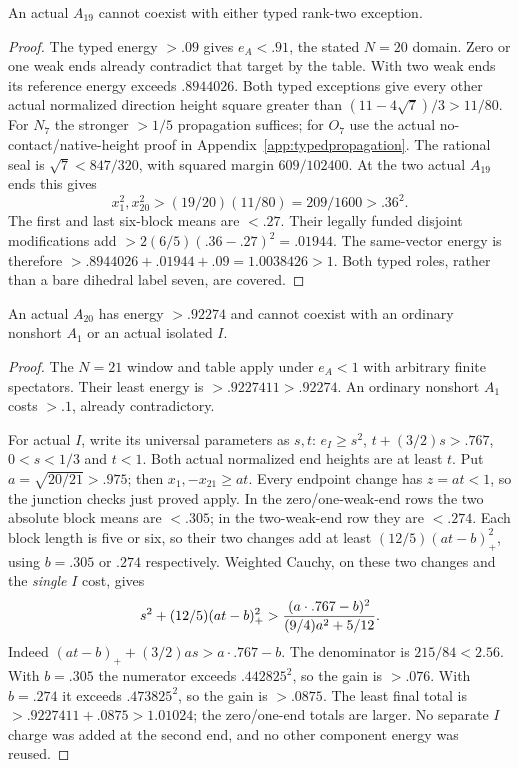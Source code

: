 \begin{lemma}
\label{app:tail:lem:A19typed}
An actual $A_{19}$ cannot coexist with either typed rank-two exception.
\end{lemma}
\begin{proof}
The typed energy $>.09$ gives $e_A<.91$, the stated $N=20$ domain.
Zero or one weak ends already contradict that target by the table.
With two weak ends its reference energy exceeds $.8944026$.
Both typed exceptions give every other actual normalized direction
height square greater than $(11-4\sqrt7)/3>11/80$.
For $N_7$ the stronger $>1/5$ propagation suffices; for $O_7$ use
the actual no-contact/native-height proof in
Appendix~\ref{app:typedpropagation}. The rational seal is
$\sqrt7<847/320$, with squared margin $609/102400$.
At the two actual $A_{19}$ ends this gives
\[
 x_1^2,x_{20}^2>(19/20)(11/80)=209/1600>.36^2.
\]
The first and last six-block means are $<.27$. Their legally
funded disjoint modifications add $>2(6/5)(.36-.27)^2=.01944$.
The same-vector energy is therefore
$>.8944026+.01944+.09=1.0038426>1$.
Both typed roles, rather than a bare dihedral label seven, are covered.
\end{proof}

\begin{lemma}
\label{app:tail:lem:A20A1}
An actual $A_{20}$ has energy $>.92274$ and cannot coexist with
an ordinary nonshort $A_1$ or an actual isolated $I$.
\end{lemma}
\begin{proof}
The $N=21$ window and table apply under $e_A<1$ with arbitrary
finite spectators. Their least energy is $>.9227411>.92274$.
An ordinary nonshort $A_1$ costs $>.1$, already contradictory.

For actual $I$, write its universal parameters as $s,t$:
$e_I\ge s^2$, $t+(3/2)s>.767$, $0<s<1/3$ and $t<1$.
Both actual normalized end heights are at least $t$. Put
$a=\sqrt{20/21}>.975$; then $x_1,-x_{21}\ge at$.
Every endpoint change has $z=at<1$, so the junction checks just
proved apply. In the zero/one-weak-end rows the two absolute block
means are $<.305$; in the two-weak-end row they are $<.274$.
Each block length is five or six, so their two changes add at least
$(12/5)(at-b)_+^2$, using $b=.305$ or $.274$ respectively.
Weighted Cauchy, on these two changes and the \emph{single} $I$ cost,
gives
\[
 s^2+(12/5)(at-b)_+^2>
 {(a\cdot.767-b)^2\over(9/4)a^2+5/12}.
\]
Indeed $(at-b)_++(3/2)as>a\cdot.767-b$.
The denominator is $215/84<2.56$. With $b=.305$ the numerator
exceeds $.442825^2$, so the gain is $>.076$.
With $b=.274$ it exceeds $.473825^2$, so the gain is $>.0875$.
The least final total is $>.9227411+.0875>1.01024$;
the zero/one-end totals are larger. No separate $I$ charge was
added at the second end, and no other component energy was reused.
\end{proof}


